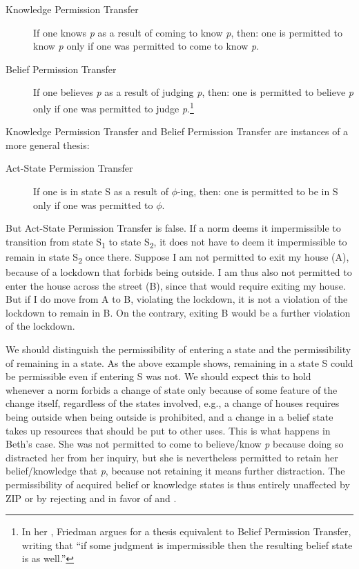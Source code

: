 \documentclass[12pt]{article}
\begin{document}
\newcommand{\pp}{Permission Transfer}
\newcommand{\ppk}{Knowledge \pp{}}
\newcommand{\ppb}{Belief \pp{}}
\newcommand{\ppa}{Act-State \pp{}}
\begin{description}
    \item[\ppk] If one knows \textit{p} as a result of coming to know \textit{p}, then: one is permitted to know \textit{p} only if one was permitted to come to know \textit{p}.
    \item[\ppb] If one believes \textit{p} as a result of judging \textit{p}, then: one is permitted to believe \textit{p} only if one was permitted to judge \textit{p}.\footnote{In her \parencite*[p.~689f]{friedman_teleological_2019}, Friedman argues for a thesis equivalent to \ppb{}, writing that ``if some judgment is impermissible then the resulting belief state is as well.''}
\end{description}
%
\ppk{} and \ppb{} are instances of a more general thesis:

\begin{description}
    \item[\ppa] If one is in state S as a result of $\phi$-ing, then: one is permitted to be in S only if one was permitted to $\phi$.
\end{description}
%
But \ppa{} is false. If a norm deems it impermissible to transition from state S\textsubscript{1} to state S\textsubscript{2}, it does not have to deem it impermissible to remain in state S\textsubscript{2} once there. Suppose I am not permitted to exit my house (A), because of a lockdown that forbids being outside. I am thus also not permitted to enter the house across the street (B), since that would require exiting my house. But if I do move from A to B, violating the lockdown, it is not a violation of the lockdown to remain in B. On the contrary, exiting B would be a further violation of the lockdown.

We should distinguish the permissibility of entering a state and the permissibility of remaining in a state. As the above example shows, remaining in a state S could be permissible even if entering S was not. We should expect this to hold whenever a norm forbids a change of state only because of some feature of the change itself, regardless of the states involved, e.g., a change of houses requires being outside when being outside is prohibited, and a change in a belief state takes up resources that should be put to other uses. This is what happens in Beth's case. She was not permitted to come to believe/know \textit{p} because doing so distracted her from her inquiry, but she is nevertheless permitted to retain her belief/knowledge that \textit{p}, because not retaining it means further distraction. The permissibility of acquired belief or knowledge states is thus entirely unaffected by ZIP or by rejecting \ep{} and \eo{} in favor of \epc{} and \eoc{}.

\printbibliography
\end{document}
